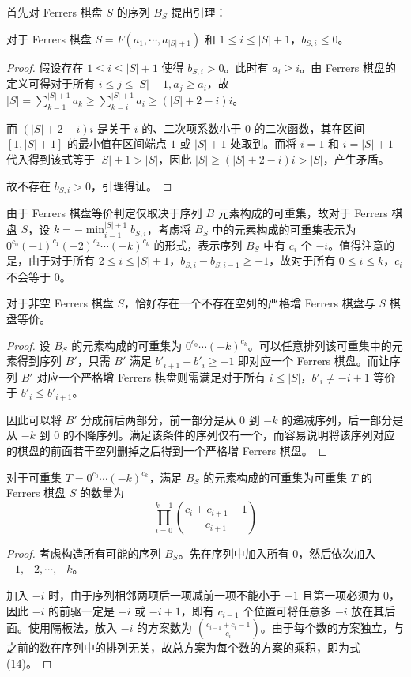\documentclass{noithesis}
\begin{document}
	首先对 Ferrers 棋盘 $S$ 的序列 $B_S$ 提出引理：
	\begin{lemma}
		对于 Ferrers 棋盘 $S = F(a_1,\cdots,a_{|S|+1})$ 和 $1 \leq i \leq |S| + 1$，$b_{S,i} \leq 0$。
	\end{lemma}
	\begin{proof}
		假设存在 $1 \leq i \leq |S| + 1$ 使得 $b_{S,i} > 0$。此时有 $a_i \geq i$。由 Ferrers 棋盘的定义可得对于所有 $i \leq j \leq |S| + 1,a_j \geq a_i$，故 $|S| =\sum_{k=1}^{|S|+1} a_k \geq \sum_{k=i}^{|S|+1}a_i \geq (|S|+2-i)i$。
		
		而 $(|S|+2-i)i$ 是关于 $i$ 的、二次项系数小于 $0$ 的二次函数，其在区间 $[1,|S|+1]$ 的最小值在区间端点 $1$ 或 $|S| + 1$ 处取到。而将 $i=1$ 和 $i=|S|+1$ 代入得到该式等于 $|S|+1 > |S|$，因此 $|S| \geq (|S|+2-i)i > |S|$，产生矛盾。
		
		故不存在 $b_{S,i} > 0$，引理得证。
	\end{proof}
	由于 Ferrers 棋盘等价判定仅取决于序列 $B$ 元素构成的可重集，故对于 Ferrers 棋盘 $S$，设 $k = -\min_{i=1}^{|S| + 1} b_{S,i}$，考虑将 $B_S$ 中的元素构成的可重集表示为 $0^{c_0}(-1)^{c_1}(-2)^{c_2}\cdots(-k)^{c_k}$ 的形式，表示序列 $B_S$ 中有 $c_i$ 个 $-i$。值得注意的是，由于对于所有 $2 \leq i \leq |S| + 1$，$b_{S,i} - b_{S,i-1} \geq -1$，故对于所有 $0 \leq i \leq k$，$c_i$ 不会等于 $0$。
	\begin{theorem} \label{strictincrease}
		对于非空 Ferrers 棋盘 $S$，恰好存在一个不存在空列的严格增 Ferrers 棋盘与 $S$ 棋盘等价。
	\end{theorem}
	\begin{proof}
		设 $B_S$ 的元素构成的可重集为 $0^{c_0}\cdots(-k)^{c_k}$。可以任意排列该可重集中的元素得到序列 $B'$，只需 $B'$ 满足 $b'_{i+1} - b'_i \geq -1$ 即对应一个 Ferrers 棋盘。而让序列 $B'$ 对应一个严格增 Ferrers 棋盘则需满足对于所有 $i \leq |S|$，$b'_i \neq -i+1$ 等价于 $b'_i \leq b'_{i+1}$。
		
		因此可以将 $B'$ 分成前后两部分，前一部分是从 $0$ 到 $-k$ 的递减序列，后一部分是从 $-k$ 到 $0$ 的不降序列。满足该条件的序列仅有一个，而容易说明将该序列对应的棋盘的前面若干空列删掉之后得到一个严格增 Ferrers 棋盘。
	\end{proof}
	\begin{theorem}\label{equalsize}
		对于可重集 $T = 0^{c_0}\cdots(-k)^{c_k}$，满足 $B_S$ 的元素构成的可重集为可重集 $T$ 的 Ferrers 棋盘 $S$ 的数量为\begin{equation}
		\prod_{i=0}^{k-1} \binom{c_i+c_{i+1}-1}{c_{i+1}}
		\end{equation}
	\end{theorem}
	\begin{proof}
		考虑构造所有可能的序列 $B_S$。先在序列中加入所有 $0$，然后依次加入 $-1,-2,\cdots,-k$。
		
		加入 $-i$ 时，由于序列相邻两项后一项减前一项不能小于 $-1$ 且第一项必须为 $0$，因此 $-i$ 的前驱一定是 $-i$ 或 $-i+1$，即有 $c_{i-1}$ 个位置可将任意多 $-i$ 放在其后面。使用隔板法，放入 $-i$ 的方案数为 $\binom{c_{i-1}+c_i-1}{c_i}$。由于每个数的方案独立，与之前的数在序列中的排列无关，故总方案为每个数的方案的乘积，即为式 (14)。
	\end{proof}
	
\end{document}
